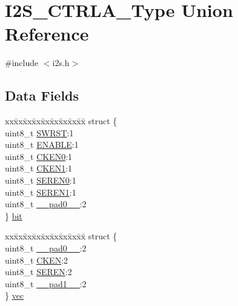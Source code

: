 \hypertarget{union_i2_s___c_t_r_l_a___type}{}\section{I2\+S\+\_\+\+C\+T\+R\+L\+A\+\_\+\+Type Union Reference}
\label{union_i2_s___c_t_r_l_a___type}


{\ttfamily \#include $<$i2s.\+h$>$}

\subsection*{Data Fields}
\begin{DoxyCompactItemize}
\item 
\begin{tabbing}
xx\=xx\=xx\=xx\=xx\=xx\=xx\=xx\=xx\=\kill
struct \{\\
\>uint8\_t \mbox{\hyperlink{union_i2_s___c_t_r_l_a___type_a9334d5ac0548802c90a8129c52c8e490}{SWRST}}:1\\
\>uint8\_t \mbox{\hyperlink{union_i2_s___c_t_r_l_a___type_a2b3662f1b123463ae1a23c1f324e5cc5}{ENABLE}}:1\\
\>uint8\_t \mbox{\hyperlink{union_i2_s___c_t_r_l_a___type_a9d1af1e88e9560a4b60513cabf39795d}{CKEN0}}:1\\
\>uint8\_t \mbox{\hyperlink{union_i2_s___c_t_r_l_a___type_aea294123bcb52574aa342d09e439a698}{CKEN1}}:1\\
\>uint8\_t \mbox{\hyperlink{union_i2_s___c_t_r_l_a___type_aa159436c10d9b842cf1ce59743691380}{SEREN0}}:1\\
\>uint8\_t \mbox{\hyperlink{union_i2_s___c_t_r_l_a___type_af6f0ba01dd8ee2fed2f001f2576229fa}{SEREN1}}:1\\
\>uint8\_t \mbox{\hyperlink{union_i2_s___c_t_r_l_a___type_a8b4eebe79ded0459acec2f4950102ba3}{\_\_pad0\_\_}}:2\\
\} \mbox{\hyperlink{union_i2_s___c_t_r_l_a___type_a03dd63cae1304bcb4ba3e87c7bbccdaa}{bit}}\\

\end{tabbing}\item 
\begin{tabbing}
xx\=xx\=xx\=xx\=xx\=xx\=xx\=xx\=xx\=\kill
struct \{\\
\>uint8\_t \mbox{\hyperlink{union_i2_s___c_t_r_l_a___type_a8b4eebe79ded0459acec2f4950102ba3}{\_\_pad0\_\_}}:2\\
\>uint8\_t \mbox{\hyperlink{union_i2_s___c_t_r_l_a___type_a022d2f8cbe4ee8518af036666e0fd370}{CKEN}}:2\\
\>uint8\_t \mbox{\hyperlink{union_i2_s___c_t_r_l_a___type_a28d3e9f9f489f453985b45cd925a2570}{SEREN}}:2\\
\>uint8\_t \mbox{\hyperlink{union_i2_s___c_t_r_l_a___type_a77f12d2e278bd5c07712648ac0df5e08}{\_\_pad1\_\_}}:2\\
\} \mbox{\hyperlink{union_i2_s___c_t_r_l_a___type_abb3bfb15e154af26f8cddb95a65a4076}{vec}}\\


\end{tabbing}
\end{DoxyCompactItemize}
